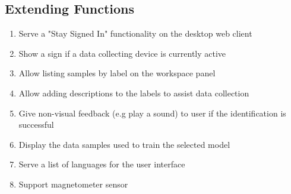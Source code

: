 \subsection{Extending Functions}
\begin{enumerate}[resume*]
    \item Serve a "Stay Signed In" functionality on the desktop web client
    \item Show a sign if a data collecting device is currently active
    \item Allow listing samples by label on the workspace panel
    \item Allow adding descriptions to the labels to assist data collection
    \item \label{/F480/} Give non-visual feedback (e.g play a sound) to user if the identification is successful
    \item Display the data samples used to train the selected model
    \item Serve a list of languages for the user interface
    \item Support magnetometer sensor
\end{enumerate}